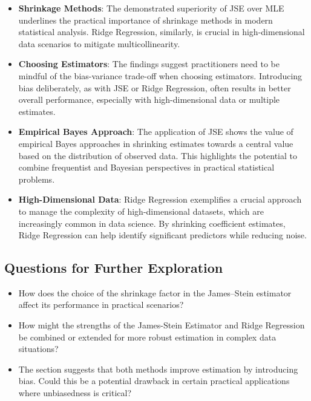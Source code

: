 \begin{itemize}
    \item \textbf{Shrinkage Methods}: The demonstrated superiority of JSE over MLE underlines the practical importance of shrinkage methods in modern statistical analysis. Ridge Regression, similarly, is crucial in high-dimensional data scenarios to mitigate multicollinearity.
    \item \textbf{Choosing Estimators}: The findings suggest practitioners need to be mindful of the bias-variance trade-off when choosing estimators. Introducing bias deliberately, as with JSE or Ridge Regression, often results in better overall performance, especially with high-dimensional data or multiple estimates.
    \item \textbf{Empirical Bayes Approach}: The application of JSE shows the value of empirical Bayes approaches in shrinking estimates towards a central value based on the distribution of observed data. This highlights the potential to combine frequentist and Bayesian perspectives in practical statistical problems.
    \item \textbf{High-Dimensional Data}: Ridge Regression exemplifies a crucial approach to manage the complexity of high-dimensional datasets, which are increasingly common in data science. By shrinking coefficient estimates, Ridge Regression can help identify significant predictors while reducing noise.
\end{itemize}

\subsection{Questions for Further Exploration}

\begin{itemize}
    \item How does the choice of the shrinkage factor in the James--Stein estimator affect its performance in practical scenarios?
    \item How might the strengths of the James-Stein Estimator and Ridge Regression be combined or extended for more robust estimation in complex data situations?
    \item The section suggests that both methods improve estimation by introducing bias. Could this be a potential drawback in certain practical applications where unbiasedness is critical?
\end{itemize}